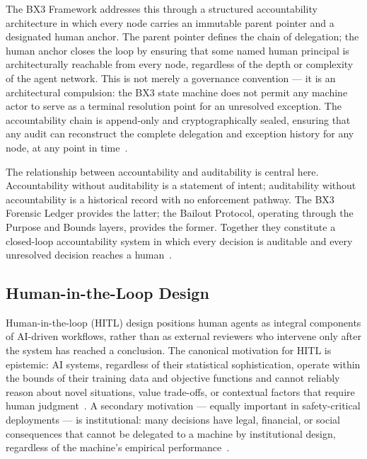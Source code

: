 The BX3 Framework addresses this through a structured accountability architecture in which every node carries an immutable parent pointer and a designated human anchor. The parent pointer defines the chain of delegation; the human anchor closes the loop by ensuring that some named human principal is architecturally reachable from every node, regardless of the depth or complexity of the agent network. This is not merely a governance convention — it is an architectural compulsion: the BX3 state machine does not permit any machine actor to serve as a terminal resolution point for an unresolved exception. The accountability chain is append-only and cryptographically sealed, ensuring that any audit can reconstruct the complete delegation and exception history for any node, at any point in time~\cite{wiener1948}.

The relationship between accountability and auditability is central here. Accountability without auditability is a statement of intent; auditability without accountability is a historical record with no enforcement pathway. The BX3 Forensic Ledger provides the latter; the Bailout Protocol, operating through the Purpose and Bounds layers, provides the former. Together they constitute a closed-loop accountability system in which every decision is auditable and every unresolved decision reaches a human~\cite{bansal2019}.

\subsection{Human-in-the-Loop Design}
\label{sec:hitl}

Human-in-the-loop (HITL) design positions human agents as integral components of AI-driven workflows, rather than as external reviewers who intervene only after the system has reached a conclusion. The canonical motivation for HITL is epistemic: AI systems, regardless of their statistical sophistication, operate within the bounds of their training data and objective functions and cannot reliably reason about novel situations, value trade-offs, or contextual factors that require human judgment~\cite{tristr81}. A secondary motivation — equally important in safety-critical deployments — is institutional: many decisions have legal, financial, or social consequences that cannot be delegated to a machine by institutional design, regardless of the machine's empirical performance~\cite{bansal2019}.

